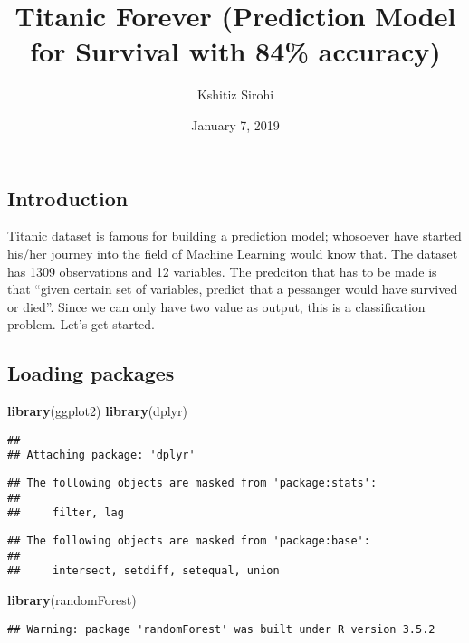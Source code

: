 \documentclass[]{article}
\title{Titanic Forever (Prediction Model for Survival with 84\% accuracy)}
\author{Kshitiz Sirohi}
\date{January 7, 2019}
\newenvironment{Shaded}{\begin{snugshade}}{\end{snugshade}}
\newcommand{\KeywordTok}[1]{\textcolor[rgb]{0.13,0.29,0.53}{\textbf{#1}}}
\newcommand{\NormalTok}[1]{#1}
\begin{document}
\maketitle

\subsection{Introduction}\label{introduction}

Titanic dataset is famous for building a prediction model; whosoever
have started his/her journey into the field of Machine Learning would
know that. The dataset has 1309 observations and 12 variables. The
predciton that has to be made is that ``given certain set of variables,
predict that a pessanger would have survived or died''. Since we can
only have two value as output, this is a classification problem. Let's
get started.

\subsection{Loading packages}\label{loading-packages}

\begin{Shaded}
\begin{Highlighting}[]
\KeywordTok{library}\NormalTok{(ggplot2)}
\KeywordTok{library}\NormalTok{(dplyr)}
\end{Highlighting}
\end{Shaded}

\begin{verbatim}
## 
## Attaching package: 'dplyr'
\end{verbatim}

\begin{verbatim}
## The following objects are masked from 'package:stats':
## 
##     filter, lag
\end{verbatim}

\begin{verbatim}
## The following objects are masked from 'package:base':
## 
##     intersect, setdiff, setequal, union
\end{verbatim}

\begin{Shaded}
\begin{Highlighting}[]
\KeywordTok{library}\NormalTok{(randomForest)}
\end{Highlighting}
\end{Shaded}

\begin{verbatim}
## Warning: package 'randomForest' was built under R version 3.5.2
\end{verbatim}
\end{document}
